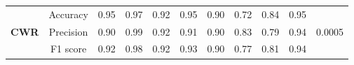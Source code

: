 \documentclass[12pt]{report}
\begin{document}
\begin{landscape}
\begin{table}[]
\begin{tabular}{cc|ccccccccc}
\multirow{3}{*}{\textbf{CWR}}                                                     & Accuracy                            & 0.95                            & 0.97                            & 0.92                            & 0.95                            & 0.90                            & 0.72                            & 0.84                            & 0.95                            & \multirow{3}{*}{0.0005}                                                           \\ \cline{2-2}
                                                                                  & Precision                           & 0.90                            & 0.99                            & 0.92                            & 0.91                            & 0.90                            & 0.83                            & 0.79                            & 0.94                            &                                                                                   \\ \cline{2-2}
                                                                                  & F1 score                            & 0.92                            & 0.98                            & 0.92                            & 0.93                            & 0.90                            & 0.77                            & 0.81                            & 0.94                            &                                                                                   
\end{tabular}
\label{table:nucleo_bigtable}
\end{table}
\end{landscape}
\end{document}
